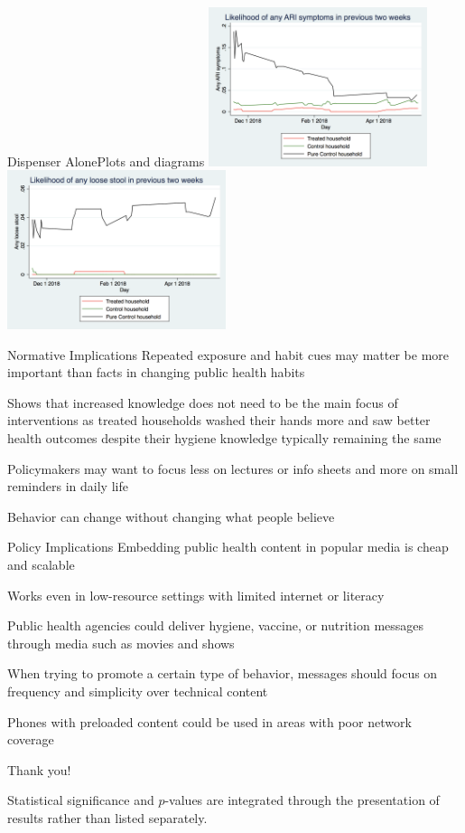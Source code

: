 \documentclass[aspectratio=169]{beamer}
\begin{document}
\begin{frame}{Dispenser Alone}{Plots and diagrams}
	\includegraphics[width=0.48\textwidth]{img-008.png}
	\includegraphics[width=0.48\textwidth]{img-010.png}
\end{frame}

\begin{frame}{Normative Implications}
	Repeated exposure and habit cues may matter be more important than facts in changing public health habits

	Shows that increased knowledge does not need to be the main focus of interventions as treated households washed their hands more and saw better health outcomes despite their hygiene knowledge typically remaining the same 

	Policymakers may want to focus less on lectures or info sheets and more on small reminders in daily life

	Behavior can change without changing what people believe
\end{frame}

\begin{frame}{Policy Implications}
	Embedding public health content in popular media is cheap and scalable

	Works even in low-resource settings with limited internet or literacy

	Public health agencies could deliver hygiene, vaccine, or nutrition messages through media such as movies and shows

	When trying to promote a certain type of behavior, messages should focus on frequency and simplicity over technical content 

	Phones with preloaded content could be used in areas with poor network coverage
\end{frame}

\begin{frame}
	\Huge
	\centering

	\vfill

	Thank you!

	\vfill

	\normalsize
	\flushleft


	\color{gray}Statistical significance and $p$-values are integrated through the
	presentation of results rather than listed separately.
\end{frame}
\end{document}
